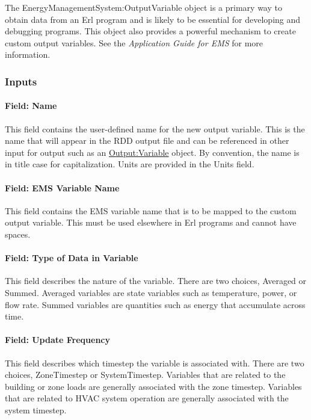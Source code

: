 The EnergyManagementSystem:OutputVariable object is a primary way to obtain data from an Erl program and is likely to be essential for developing and debugging programs. This object also provides a powerful mechanism to create custom output variables. See the \emph{Application Guide for EMS} for more information.

\subsubsection{Inputs}\label{inputs-6-008}

\paragraph{Field: Name}\label{field-name-5-008}

This field contains the user-defined name for the new output variable. This is the name that will appear in the RDD output file and can be referenced in other input for output such as an \hyperref[outputvariable]{Output:Variable} object. By convention, the name is in title case for capitalization. Units are provided in the Units field.

\paragraph{Field: EMS Variable Name}\label{field-ems-variable-name}

This field contains the EMS variable name that is to be mapped to the custom output variable. This must be used elsewhere in Erl programs and cannot have spaces.

\paragraph{Field: Type of Data in Variable}\label{field-type-of-data-in-variable}

This field describes the nature of the variable. There are two choices, Averaged or Summed. Averaged variables are state variables such as temperature, power, or flow rate. Summed variables are quantities such as energy that accumulate across time.

\paragraph{Field: Update Frequency}\label{field-update-frequency}

This field describes which timestep the variable is associated with. There are two choices, ZoneTimestep or SystemTimestep. Variables that are related to the building or zone loads are generally associated with the zone timestep. Variables that are related to HVAC system operation are generally associated with the system timestep.


